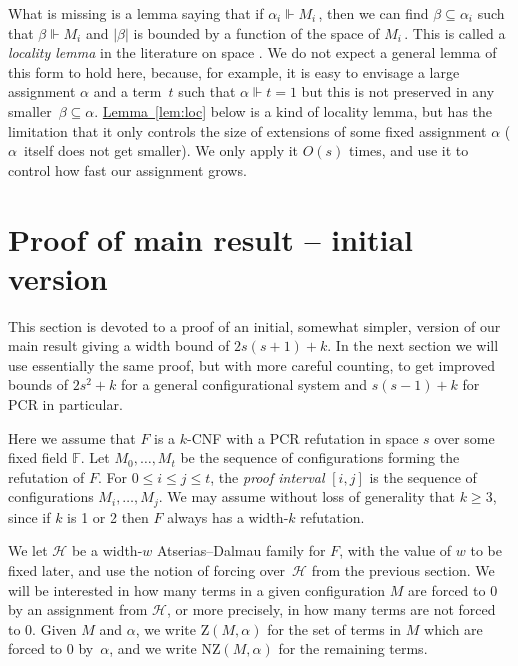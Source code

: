 \documentclass[11pt]{article}
\numberwithin{equation}{section}
\theoremstyle{definition}
\theoremstyle{plain}
\newcommand{\expref}[2]{\hyperref[#2]{#1~\ref{#2}}}
\newcommand\calH{\mathcal{H}}
\newcommand\bbF{\mathbb{F}}
\newcommand\rmNZ{\mathrm{NZ}}
\newcommand\rmZ{\mathrm{Z}}
\begin{document}
What is missing is a lemma saying that 
if $\alpha_i \Vdash M_i$\,, then we can find $\beta \subseteq \alpha_i$
such that $\beta \Vdash M_i$ and $|\beta|$ is bounded by a  
function of the space of $M_i$\,.
This is called a \emph{locality lemma} in the literature on space
\cite{ABRW,DBLP:journals/rsa/Ben-SassonG03,DBLP:journals/jacm/BonacinaG15}.
We do not expect a general lemma of this form to hold here,
because, for example, it is easy to envisage a large assignment
$\alpha$ and a term~$t$ such that $\alpha \Vdash t=1$
but this is not preserved in any smaller~$\beta \subseteq \alpha$.
\expref{Lemma}{lem:loc} below is a kind of locality lemma, but has
the limitation that it only controls the size of extensions of some fixed
assignment $\alpha$ ($\alpha$~itself does not get smaller). 
We only apply it $O(s)$ times, and use it to control how fast our assignment grows.

%
\section{Proof of main result -- initial version} \label{sec:main}\label{sec:upanddown}
%

This section is devoted to a proof of an initial, somewhat simpler, version of our main result
giving a width bound of $2s(s+1)+k$.
In the next section we will use essentially the same proof,
but with more careful counting, to get improved bounds
of $2s^2+k$ for a general configurational system
and $s(s-1)+k$ for PCR in particular.


Here we assume that $F$ is a $k$-CNF 
with a PCR refutation in space $s$ over
some fixed field $\bbF$. 
Let $M_0, \ldots, M_t$ be the sequence of configurations
forming the refutation of $F$. For $0 \le i \le j \le t$,
the \emph{proof interval} $[i,j]$ is the sequence of configurations $M_i, \ldots, M_j$.
We may assume without loss of generality that $k \ge 3$, since if $k$ is 1 or 2
then $F$ always has a width-$k$ refutation. 

We let $\calH$ be a width-$w$ Atserias--Dalmau family for $F$,
with the value of $w$ to be fixed later,
 and  use the notion of forcing over~$\calH$ from
the previous section.
We will be interested in how many terms in a given configuration
$M$ are forced to $0$ by an assignment from $\calH$, 
or more precisely, in how many terms are not forced to $0$. 
Given $M$ and $\alpha$, 
we write $\rmZ(M, \alpha)$ for the set of terms in $M$ which 
are forced to $0$ by~$\alpha$, and we write $\rmNZ(M, \alpha)$
for the remaining terms.
\end{document}
